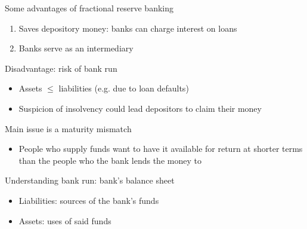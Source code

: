 \documentclass{beamer}
\begin{document}
\begin{frame}
 Some advantages of fractional reserve banking
\begin{enumerate}
  \item Saves depository money: banks can charge interest on loans
  \item Banks serve as an intermediary  
\end{enumerate}
 \medskip
 Disadvantage: risk of bank run
 \begin{itemize}
   \item Assets $\leq$ liabilities (e.g. due to loan defaults)
   \item Suspicion of insolvency could lead depositors to claim their money
 \end{itemize}
 \medskip
 Main issue is a maturity mismatch
 \begin{itemize}
   \item People who supply funds want to have it available for return at shorter terms than the people who the bank lends the money to
 \end{itemize}
\end{frame}

\begin{frame}
 Understanding bank run: bank's balance sheet 
\begin{itemize}
  \item Liabilities: sources of the bank's funds
  \item Assets: uses of said funds
\end{itemize}
\end{frame}

\begin{frame}
\begin{table}[!h] \centering
\caption{Stylised bank balance sheet}
\end{table}
\end{frame}
\end{document}
